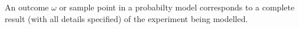 An outcome $\omega$ or sample point in a probabilty model corresponds to a complete result (with all details specified) of the experiment being modelled.
